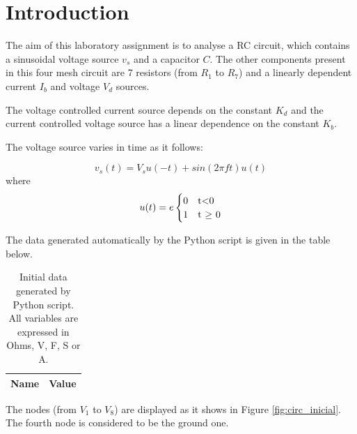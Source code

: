 \section{Introduction}
\label{introduction}


\par The aim of this laboratory assignment is to analyse a RC circuit, which contains a sinusoidal voltage source $v_s$ and a capacitor $C$. The other components present in this four mesh circuit are 7 resistors (from $R_1$ to $R_7$) and a linearly dependent current $I_b$ and voltage $V_d$ sources.
\par The voltage controlled current source depends on the constant $K_d$ and the current controlled voltage source has a linear dependence on the constant $K_b$.

\par The voltage source varies in time as it follows:

\begin{equation}
v_s(t) = V_s u(-t) + sin(2 \pi f t)u(t)
\label {equation:n1}
\end{equation}
where
\begin{equation}
u(t)=e
\begin{cases}
0 & $t$ < $0$ \\
1 & $t $\geq$ 0$
\end{cases}
\label {eq:n2}
\end{equation}

\par The data generated automatically by the Python script is given in the table below.

\begin{table}[ht]
  \centering
  \begin{tabular}{|l|r|}
    \hline    
    {\bf Name} & {\bf Value} \\ \hline
    
  \end{tabular}
  \caption{Initial data generated by Python script. All variables are expressed in Ohms, V, F, S or A.}
  \label{tab:initial_data}
\end{table}



\par The nodes (from $V_1$ to $V_8$) are displayed as it shows in Figure \ref{fig:circ_inicial}. The fourth node is considered to be the ground one.


\par
   

